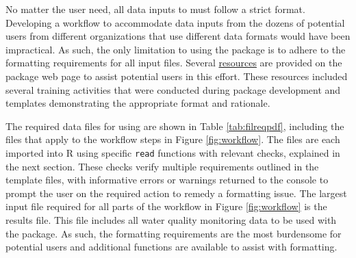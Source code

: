 No matter the user need, all data inputs to  must follow a strict format. Developing a workflow to accommodate data inputs from the dozens of potential users from different organizations that use different data formats would have been impractical. As such, the only limitation to using the package is to adhere to the formatting requirements for all input files. Several \href{https://massbays-tech.github.io/MassWateR/RESOURCES.html}{resources} are provided on the package web page to assist potential users in this effort. These resources included several training activities that were conducted during package development and templates demonstrating the appropriate format and rationale.

The required data files for using  are shown in Table \ref{tab:filreqpdf}, including the files that apply to the workflow steps in Figure \ref{fig:workflow}. The files are each imported into R using specific \texttt{read} functions with relevant checks, explained in the next section. These checks verify multiple requirements outlined in the template files, with informative errors or warnings returned to the console to prompt the user on the required action to remedy a formatting issue. The largest input file required for all parts of the workflow in Figure \ref{fig:workflow} is the results file. This file includes all water quality monitoring data to be used with the package. As such, the formatting requirements are the most burdensome for potential users and additional functions are available to assist with formatting.

\setlength{\tabcolsep}{0pt}

\renewcommand*{\arraystretch}{1.5}

\providecommand{\ascline}[3]{\noalign{\global\Oldarrayrulewidth #1}\arrayrulecolor[HTML]{#2}\cline{#3}}

